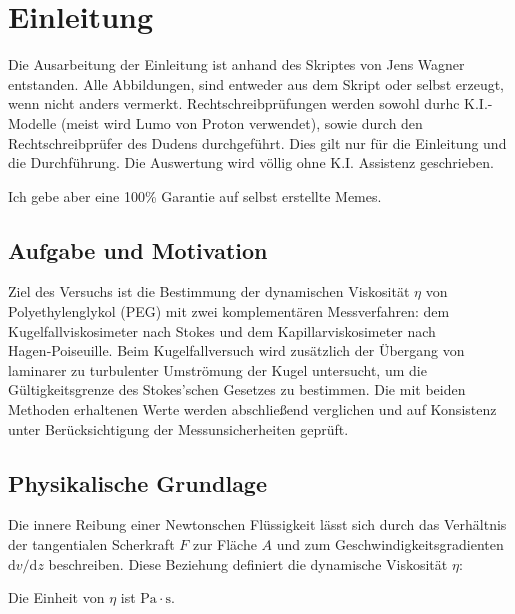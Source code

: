 \chapter{Einleitung} \label{ch:Einleitung}


Die Ausarbeitung der Einleitung ist anhand des Skriptes von Jens Wagner entstanden. Alle Abbildungen, sind entweder aus dem Skript oder selbst erzeugt, wenn nicht anders vermerkt. Rechtschreibprüfungen werden sowohl durhc K.I.-Modelle (meist wird Lumo von Proton verwendet), sowie durch den Rechtschreibprüfer des Dudens durchgeführt.  Dies gilt nur für die Einleitung und die Durchführung. Die Auswertung wird völlig ohne K.I. Assistenz geschrieben. \cite{skriptPAP21, Duden}

Ich gebe aber eine 100\% Garantie auf selbst erstellte Memes.


\section{Aufgabe und Motivation}
\label{sec:AuM}

Ziel des Versuchs ist die Bestimmung der dynamischen Viskosität \(\eta\) von Polyethylenglykol (PEG) mit zwei komplementären Messverfahren: dem Kugelfallviskosimeter nach Stokes und dem Kapillarviskosimeter nach Hagen‑Poiseuille. Beim Kugelfallversuch wird zusätzlich der Übergang von laminarer zu turbulenter Umströmung der Kugel untersucht, um die Gültigkeitsgrenze des Stokes'schen Gesetzes zu bestimmen. Die mit beiden Methoden erhaltenen Werte werden abschließend verglichen und auf Konsistenz unter Berücksichtigung der Messunsicherheiten geprüft.

\section{Physikalische Grundlage}
\label{sec:PhyBasics}

Die innere Reibung einer Newtonschen Flüssigkeit lässt sich durch das Verhältnis der tangentialen Scherkraft \(F\) zur Fläche \(A\) und zum Geschwindigkeitsgradienten \(\mathrm{d}v/\mathrm{d}z\) beschreiben. Diese Beziehung definiert die dynamische Viskosität \(\eta\):

Die Einheit von \(\eta\) ist \(\mathrm{Pa\cdot s}\).

